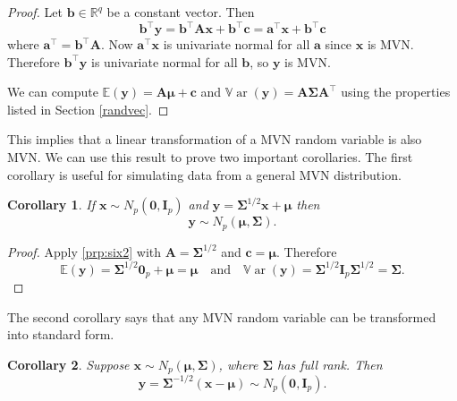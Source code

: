 \documentclass[]{book}
\newtheorem{corollary}{Corollary}[chapter]
\theoremstyle{definition}
\theoremstyle{definition}
\theoremstyle{definition}
\theoremstyle{remark}
\begin{document}
\begin{proof}
{}Let \(\mathbf b\in \mathbb{R}^q\) be a constant vector. Then
\[ \mathbf b^\top \mathbf y= \mathbf b^\top \mathbf A\mathbf x+ \mathbf b^\top \mathbf c= \mathbf a^\top \mathbf x+ \mathbf b^\top \mathbf c\]
where \(\mathbf a^\top = \mathbf b^\top \mathbf A\). Now \(\mathbf a^\top \mathbf x\) is univariate normal for all \(\mathbf a\) since \(\mathbf x\) is MVN. Therefore \(\mathbf b^\top \mathbf y\) is univariate normal for all \(\mathbf b\), so \(\mathbf y\) is MVN.

We can compute \({\mathbb{E}}(\mathbf y)=\mathbf A{\boldsymbol{\mu}}+\mathbf c\) and \({\mathbb{V}\operatorname{ar}}(\mathbf y)=\mathbf A\boldsymbol{\Sigma}\mathbf A^\top\) using the properties listed in Section \ref{randvec}.
\end{proof}

This implies that a linear transformation of a MVN random variable is also MVN. We can use this result to prove two important corollaries. The first corollary is useful for simulating data from a general MVN distribution.

\begin{corollary}
\protect\hypertarget{cor:csix2}{}{\label{cor:csix2} } If \(\mathbf x\sim N_p(\boldsymbol 0,\mathbf I_p)\) and \(\mathbf y= \boldsymbol{\Sigma}^{1/2} \mathbf x+ {\boldsymbol{\mu}}\) then \[\mathbf y\sim N_p({\boldsymbol{\mu}},\boldsymbol{\Sigma}).\]
\end{corollary}

\begin{proof}
{}Apply \ref{prp:six2} with \(\mathbf A= \boldsymbol{\Sigma}^{1/2}\) and \(\mathbf c= {\boldsymbol{\mu}}\). Therefore
\[{\mathbb{E}}(\mathbf y) = \boldsymbol{\Sigma}^{1/2} \boldsymbol 0_p + {\boldsymbol{\mu}}= {\boldsymbol{\mu}}\quad \mbox{and}\quad {\mathbb{V}\operatorname{ar}}(\mathbf y) = \boldsymbol{\Sigma}^{1/2} \mathbf I_p \boldsymbol{\Sigma}^{1/2} = \boldsymbol{\Sigma}.\]
\end{proof}

The second corollary says that any MVN random variable can be transformed into standard form.

\begin{corollary}
\protect\hypertarget{cor:csix3}{}{\label{cor:csix3} }Suppose \(\mathbf x\sim N_p({\boldsymbol{\mu}},\boldsymbol{\Sigma})\), where \(\boldsymbol{\Sigma}\) has full rank. Then\\
\[\mathbf y= \boldsymbol{\Sigma}^{-1/2}(\mathbf x- {\boldsymbol{\mu}}) \sim N_p(\boldsymbol 0,\mathbf I_p).\]
\end{corollary}
\end{document}
